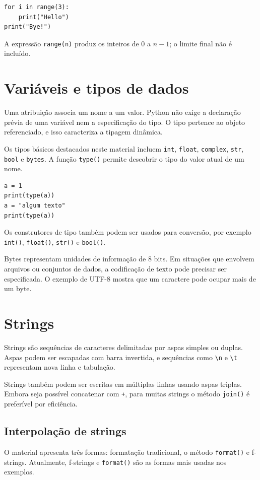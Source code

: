 \documentclass[11pt,a4paper]{article}
\begin{document}
\begin{lstlisting}
for i in range(3):
    print("Hello")
print("Bye!")
\end{lstlisting}

A expressão \texttt{range(n)} produz os inteiros de 0 a \(n-1\); o limite final não é incluído.

\section{Variáveis e tipos de dados}
Uma atribuição associa um nome a um valor. Python não exige a declaração prévia de uma variável nem a especificação do tipo. O tipo pertence ao objeto referenciado, e isso caracteriza a tipagem dinâmica.

Os tipos básicos destacados neste material incluem \texttt{int}, \texttt{float}, \texttt{complex}, \texttt{str}, \texttt{bool} e \texttt{bytes}. A função \texttt{type()} permite descobrir o tipo do valor atual de um nome.

\begin{lstlisting}
a = 1
print(type(a))
a = "algum texto"
print(type(a))
\end{lstlisting}

Os construtores de tipo também podem ser usados para conversão, por exemplo \texttt{int()}, \texttt{float()}, \texttt{str()} e \texttt{bool()}.

Bytes representam unidades de informação de 8 bits. Em situações que envolvem arquivos ou conjuntos de dados, a codificação de texto pode precisar ser especificada. O exemplo de UTF-8 mostra que um caractere pode ocupar mais de um byte.

\section{Strings}
Strings são sequências de caracteres delimitadas por aspas simples ou duplas. Aspas podem ser escapadas com barra invertida, e sequências como \texttt{\textbackslash n} e \texttt{\textbackslash t} representam nova linha e tabulação.

Strings também podem ser escritas em múltiplas linhas usando aspas triplas. Embora seja possível concatenar com \texttt{+}, para muitas strings o método \texttt{join()} é preferível por eficiência.

\subsection{Interpolação de strings}
O material apresenta três formas: formatação tradicional, o método \texttt{format()} e f-strings. Atualmente, f-strings e \texttt{format()} são as formas mais usadas nos exemplos.
\end{document}

